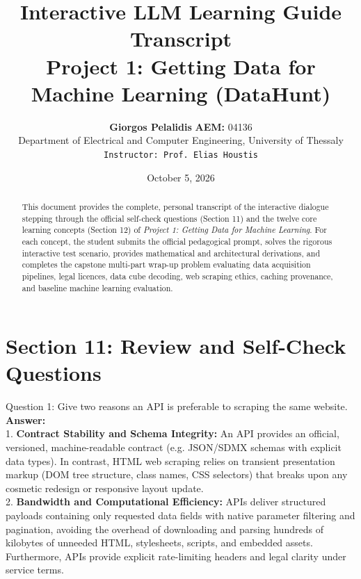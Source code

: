 \documentclass[11pt,a4paper]{article}
\title{\vspace{-1.5cm}\LARGE\bfseries\color{themeblue} Interactive LLM Learning Guide Transcript\\[4pt]
\Large Project 1: Getting Data for Machine Learning (DataHunt)}
\author{\textbf{Giorgos Pelalidis} \quad \textbf{AEM:} 04136 \\
Department of Electrical and Computer Engineering, University of Thessaly \\
\texttt{Instructor: Prof. Elias Houstis}}
\date{October 5, 2026}
\begin{document}
\maketitle
\thispagestyle{fancy}

\begin{abstract}
This document provides the complete, personal transcript of the interactive dialogue stepping through the official self-check questions (Section 11) and the twelve core learning concepts (Section 12) of \emph{Project 1: Getting Data for Machine Learning}. For each concept, the student submits the official pedagogical prompt, solves the rigorous interactive test scenario, provides mathematical and architectural derivations, and completes the capstone multi-part wrap-up problem evaluating data acquisition pipelines, legal licences, data cube decoding, web scraping ethics, caching provenance, and baseline machine learning evaluation.
\end{abstract}

\vspace{0.5cm}
\tableofcontents
\newpage

\section{Section 11: Review and Self-Check Questions}

\begin{testbox}{Question 1: Give two reasons an API is preferable to scraping the same website.}
\textbf{Answer:}\\
1. \textbf{Contract Stability and Schema Integrity:} An API provides an official, versioned, machine-readable contract (e.g. JSON/SDMX schemas with explicit data types). In contrast, HTML web scraping relies on transient presentation markup (DOM tree structure, class names, CSS selectors) that breaks upon any cosmetic redesign or responsive layout update.\\
2. \textbf{Bandwidth and Computational Efficiency:} APIs deliver structured payloads containing only requested data fields with native parameter filtering and pagination, avoiding the overhead of downloading and parsing hundreds of kilobytes of unneeded HTML, stylesheets, scripts, and embedded assets. Furthermore, APIs provide explicit rate-limiting headers and legal clarity under service terms.
\end{testbox}
\end{document}
